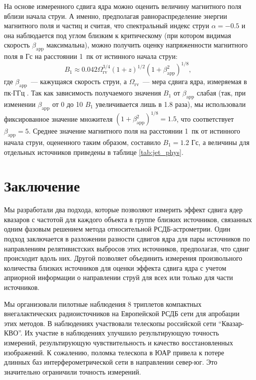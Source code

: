 На основе измеренного сдвига ядра можно оценить величину магнитного поля вблизи начала струи. А
именно, предполагая равнораспределение энергии магнитного поля и частиц и считая, что спектральный
индекс струи $\alpha=-0.5$ и она наблюдается под углом близким
к критическому (при котором видимая скорость $\beta_\mathrm{app}$ максимальна), можно получить
оценку напряженности магнитного поля в Гс на расстоянии 1~пк от истинного начала струи:
\begin{equation}
B_1 \approx 0.042 \Omega_\mathrm{rv}^{3/4} (1+z)^{1/2} (1+\beta_\mathrm{app}^2)^{1/8},
\label{eq:b1}
\end{equation}
где $\beta_\mathrm{app}$~--- кажущаяся скорость струи, а $\Omega_\mathrm{rv}$~--- мера сдвига ядра,
измеряемая в пк$\cdot$ГГц \cite{Pushkarev_2012}.
Так как зависимость получаемого значения $B_1$ от $\beta_\mathrm{app}$ слабая (так, при изменении
$\beta_\mathrm{app}$ от 0 до 10 $B_1$ увеличивается лишь в 1.8 раза), мы использовали фиксированное
значение множителя $(1+\beta_\mathrm{app}^2)^{1/8} = 1.5$, что соответствует $\beta_\mathrm{app}
= 5$. Среднее значение магнитного поля на расстоянии 1~пк от истинного начала струи, оцененного
таким образом, составило $B_1 = 1.2$ Гс, а величины для отдельных источников приведены в таблице
\ref{tab:jet_phys}.


\section{Заключение}

Мы разработали два подхода, которые позволяют измерить эффект сдвига ядер квазаров с частотой для
каждого объекта в группе близких источников, связанных одним фазовым решением метода относительной
РСДБ-астрометрии. Один подход заключается в разложении разности сдвигов ядра для пары источников по
направлениям релятивистских выбросов этих источников, предполагая, что сдвиг происходит вдоль них.
Другой позволяет объединить измерения произвольного количества близких источников для оценки эффекта
сдвига ядра с учетом априорной информации о направлении струй для всех или только для части
источников.

Мы организовали пилотные наблюдения 8 триплетов компактных внегалактических радиоисточников на
Европейской РСДБ сети для апробации этих методов. В наблюдениях участвовали телескопы российской
сети ``Квазар-КВО''. Их участие в наблюдениях улучшило результирующую точность измерений,
результирующую чувствительность и качество восстановленных изображений. К сожалению, поломка
телескопа в ЮАР привела к потере длинных баз интерферометрической сети в направлении север-юг. Это
значительно ограничили точность измерений.

